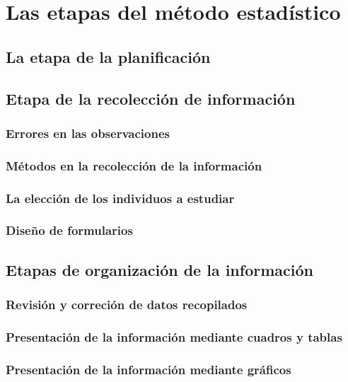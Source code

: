 \section{Las etapas del método estadístico}
    \lipsum
    \subsection{La etapa de la planificación}
        \lipsum[1]
    \subsection{Etapa de la recolección de información }
        \lipsum[1]
        \subsubsection{Errores en las observaciones}
            \lipsum[1]
        \subsubsection{Métodos en la recolección de la información}
            \lipsum[1]
        \subsubsection{La elección de los individuos a estudiar}
            \lipsum[1]
        \subsubsection{Diseño de formularios}
            \lipsum[1]
    \subsection{Etapas de organización de la información}
        \lipsum[1]
        \subsubsection{Revisión y correción de datos recopilados}
            \lipsum[1]
        \subsubsection{Presentación de la información mediante cuadros y tablas}
            \lipsum[1]
        \subsubsection{Presentación de la información mediante gráficos}
            \lipsum[1]
